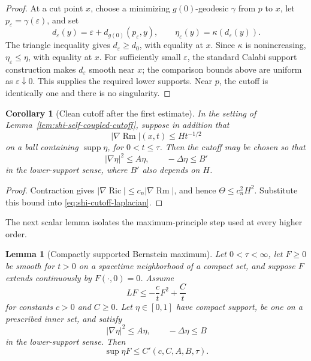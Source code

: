 \documentclass[10pt]{coll-l}
\newtheorem{corollary}[theorem]{Corollary}
\newtheorem{lemma}[theorem]{Lemma}
\theoremstyle{definition}
\theoremstyle{remark}
\numberwithin{section}{chapter}
\numberwithin{equation}{chapter}
\newcommand{\Ric}{\operatorname{Ric}}
\newcommand{\Rm}{\operatorname{Rm}}
\begin{document}
\begin{proof}
At a cut point $x$, choose a minimizing $g(0)$-geodesic $\gamma$ from $p$
to $x$, let $p_\varepsilon=\gamma(\varepsilon)$, and set
\[
 d_\varepsilon(y)=\varepsilon+d_{g(0)}(p_\varepsilon,y),
 \qquad \eta_\varepsilon(y)=\kappa(d_\varepsilon(y)).
\]
The triangle inequality gives $d_\varepsilon\geq d_0$, with equality at
$x$.  Since $\kappa$ is nonincreasing,
$\eta_\varepsilon\leq\eta$, with equality at $x$.  For sufficiently small
$\varepsilon$, the standard Calabi support construction makes
$d_\varepsilon$ smooth near $x$; the comparison bounds above are uniform as
$\varepsilon\downarrow0$.  This supplies the required lower supports.  Near
$p$, the cutoff is identically one and there is no singularity.
\end{proof}

\begin{corollary}[Clean cutoff after the first estimate]
\label{cor:shi-clean-cutoff}
In the setting of Lemma~\ref{lem:shi-self-coupled-cutoff}, suppose in
addition that
\[
       |\nabla\Rm|(x,t)\leq Ht^{-1/2}
\]
on a ball containing $\operatorname{supp}\eta$, for $0<t\leq\tau$.
Then the cutoff may be chosen so that
\begin{equation}
             |\nabla\eta|^2\leq A\eta,
             \qquad -\Delta\eta\leq B'                  \label{eq:shi-clean-cutoff-bounds}
\end{equation}
in the lower-support sense, where $B'$ also depends on $H$.
\end{corollary}

\begin{proof}
Contraction gives $|\nabla\Ric|\leq c_n|\nabla\Rm|$, and hence
$\Theta\leq c_n^2H^2$.  Substitute this bound into
\eqref{eq:shi-cutoff-laplacian}.
\end{proof}

The next scalar lemma isolates the maximum-principle step used at every
higher order.

\begin{lemma}[Compactly supported Bernstein maximum]
\label{lem:shi-compact-bernstein-maximum}
Let $0<\tau<\infty$, let $F\geq0$ be smooth for $t>0$ on a spacetime
neighborhood of a compact set, and suppose $F$ extends continuously by
$F(\cdot,0)=0$.  Assume
\begin{equation}
       LF\leq-\frac c tF^2+\frac Ct                       \label{eq:shi-abstract-F-evolution}
\end{equation}
for constants $c>0$ and $C\geq0$.  Let $\eta\in[0,1]$ have compact support,
be one on a prescribed inner set, and satisfy
\[
       |\nabla\eta|^2\leq A\eta,
       \qquad -\Delta\eta\leq B
\]
in the lower-support sense.  Then
\begin{equation}
        \sup \eta F\leq C'(c,C,A,B,\tau).                \label{eq:shi-abstract-local-bound}
\end{equation}
\end{lemma}
\end{document}
